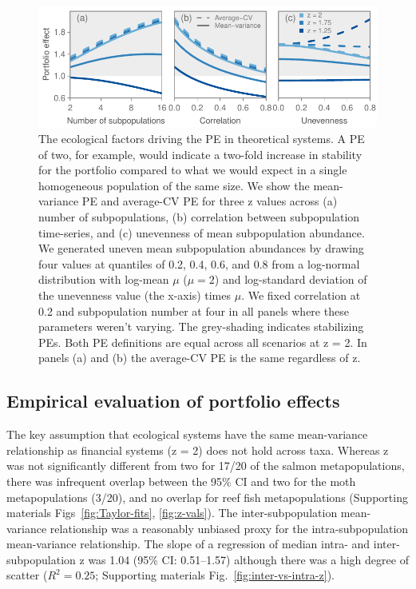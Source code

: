 \begin{figure}[htbp]
  \centering \includegraphics[width=4.8in]{prophets/fig2}
  \caption[The ecological factors driving the PE in theoretical systems.]{
  The ecological factors driving the PE in theoretical systems. A PE of
    two, for example, would indicate a two-fold increase in stability for the
    portfolio compared to what we would expect in a single homogeneous
    population of the same size. We show the mean-variance PE and average-CV PE
    for three z values across (a) number of subpopulations, (b)
    correlation between subpopulation time-series, and (c) unevenness of mean
    subpopulation abundance. We generated uneven mean subpopulation abundances
    by drawing four values at quantiles of 0.2, 0.4, 0.6, and 0.8
    from a log-normal distribution
    with log-mean $\mu$ ($\mu = 2$) and log-standard deviation of the
    unevenness value (the x-axis) times $\mu$. We fixed correlation at 0.2 and subpopulation
    number at four in all panels where these parameters weren't varying. The
    grey-shading indicates stabilizing PEs. Both PE definitions are equal
    across all scenarios at z = 2. In panels (a) and (b) the average-CV PE is
    the same regardless of z.
  } \label{fig:lines}
\end{figure}


\subsection{Empirical evaluation of portfolio effects}

The key assumption that ecological systems have the same mean-variance
relationship as financial systems (z = 2) does not hold across
taxa. Whereas z was not significantly different from two for
17/20 of the salmon metapopulations,
there was infrequent overlap between the 95\% CI and two for the moth
metapopulations (3/20), and no overlap for
reef fish metapopulations (Supporting materials Figs~\ref{fig:Taylor-fits}, \ref{fig:z-vals}). The
inter-subpopulation mean-variance relationship was a reasonably unbiased proxy
for the intra-subpopulation mean-variance relationship. The slope of a
regression of median intra- and inter-subpopulation z was 1.04 (95\% CI:
0.51--1.57) although there was a high degree of scatter ($R^2 = 0.25$;
Supporting materials Fig.~\ref{fig:inter-vs-intra-z}).


